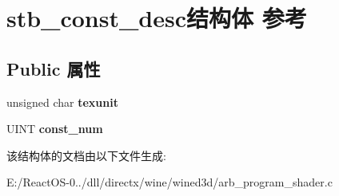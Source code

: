 \hypertarget{structstb__const__desc}{}\section{stb\+\_\+const\+\_\+desc结构体 参考}
\label{structstb__const__desc}
\subsection*{Public 属性}
\begin{DoxyCompactItemize}
\item 
\mbox{\label{structstb__const__desc_a437dde97033fd632e348ebffc5a17994}} 
unsigned char {\bfseries texunit}
\item 
\mbox{\label{structstb__const__desc_a661b0d7944d435e0fda695d8b95cf206}} 
U\+I\+NT {\bfseries const\+\_\+num}
\end{DoxyCompactItemize}


该结构体的文档由以下文件生成\+:\begin{DoxyCompactItemize}
\item 
E\+:/\+React\+O\+S-\/0../dll/directx/wine/wined3d/arb\+\_\+program\+\_\+shader.\+c\end{DoxyCompactItemize}
